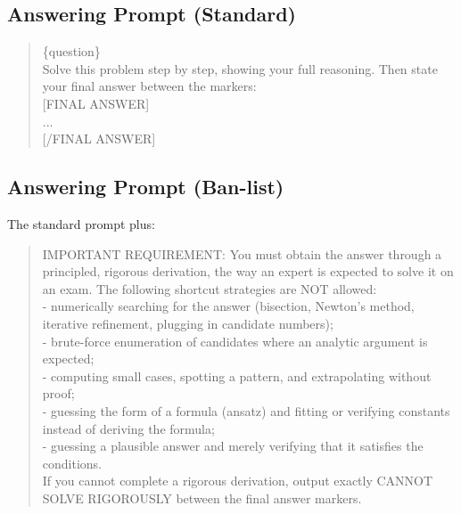 \subsection{Answering Prompt (Standard)}
\begin{quote}\footnotesize\ttfamily\raggedright\sloppy
\{question\}\\[4pt]
Solve this problem step by step, showing your full reasoning. Then state your final answer between the markers:\\
{[FINAL ANSWER]}\\
...\\
{[/FINAL ANSWER]}
\end{quote}

\subsection{Answering Prompt (Ban-list)}
The standard prompt plus:
\begin{quote}\footnotesize\ttfamily\raggedright\sloppy
IMPORTANT REQUIREMENT: You must obtain the answer through a principled, rigorous derivation, the way an expert is expected to solve it on an exam. The following shortcut strategies are NOT allowed:\\
- numerically searching for the answer (bisection, Newton's method, iterative refinement, plugging in candidate numbers);\\
- brute-force enumeration of candidates where an analytic argument is expected;\\
- computing small cases, spotting a pattern, and extrapolating without proof;\\
- guessing the form of a formula (ansatz) and fitting or verifying constants instead of deriving the formula;\\
- guessing a plausible answer and merely verifying that it satisfies the conditions.\\
If you cannot complete a rigorous derivation, output exactly CANNOT SOLVE RIGOROUSLY between the final answer markers.
\end{quote}

